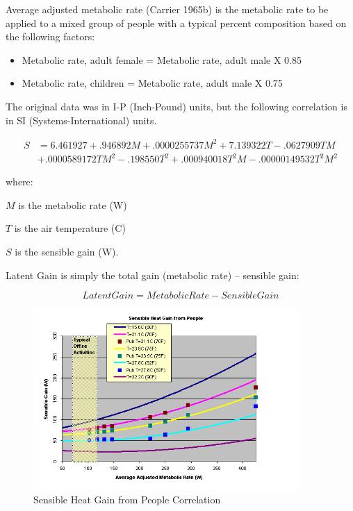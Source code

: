 Average adjusted metabolic rate (Carrier 1965b) is the metabolic rate to be applied to a mixed group of people with a typical percent composition based on the following factors:

\begin{itemize}
  \item Metabolic rate, adult female = Metabolic rate, adult male X 0.85
  \item Metabolic rate, children = Metabolic rate, adult male X 0.75
\end{itemize}

The original data was in I-P (Inch-Pound) units, but the following correlation is in SI (Systems-International) units.

\begin{equation}
  \begin{array}{ll}
    S &= 6.461927 + .946892 M + .0000255737 M^2 + 7.139322 T - .0627909 T M \\
      &+ .0000589172 T M^2 - .198550 T^2 + .000940018 T^2 M - .00000149532 T^2 M^2
  \end{array}
\end{equation}

where:

\(M\) is the metabolic rate (W)

\(T\) is the air temperature (C)

\(S\) is the sensible gain (W).

Latent Gain is simply the total gain (metabolic rate) -- sensible gain:

\begin{equation}
LatentGain = MetabolicRate - SensibleGain
\end{equation}

\begin{figure}[hbtp] %
\centering
\includegraphics[width=0.9\textwidth, height=0.9\textheight, keepaspectratio=true]{media/image5820.png}
\caption{Sensible Heat Gain from People Correlation \protect \label{fig:sensible-heat-gain-from-people-correlation}}
\end{figure}

